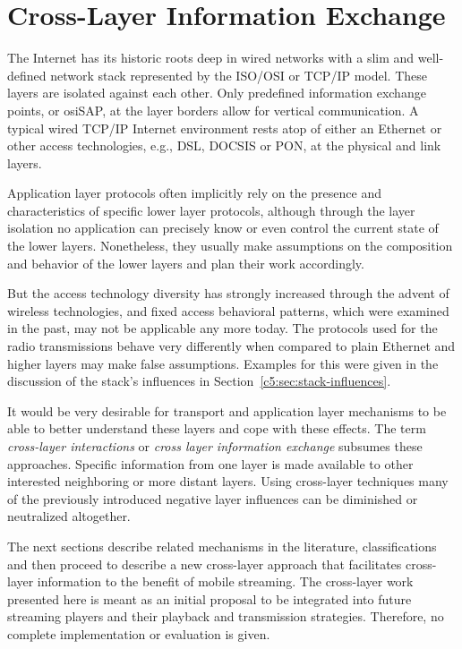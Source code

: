 \section{Cross-Layer Information Exchange}
\label{c5:sec:crosslayerhinting}

The Internet has its historic roots deep in wired networks with a slim and well-defined network stack represented by the \acrshort{ISO}/\acrshort{OSI} or \gls{TCP}/\gls{IP} model. These layers are isolated against each other. Only predefined information exchange points, or \gls{osiSAP}, at the layer borders allow for vertical communication. A typical wired \gls{TCP}/\gls{IP} Internet environment rests atop of either an Ethernet or other access technologies, e.g., \acrshort{DSL}, \acrshort{DOCSIS} or \acrshort{PON}, at the physical and link layers.

Application layer protocols often implicitly rely on the presence and characteristics of specific lower layer protocols,  although through the layer isolation no application can precisely know or even control the current state of the lower layers. Nonetheless, they usually make assumptions on the composition and behavior of the lower layers and plan their work accordingly. 

But the access technology diversity has strongly increased through the advent of wireless technologies, and fixed access behavioral patterns, which were examined in the past, may not be applicable any more today. The protocols used for the radio transmissions behave very differently when compared to plain Ethernet and higher layers may make false assumptions. Examples for this were given in the discussion of the stack's influences in Section~\ref{c5:sec:stack-influences}.

It would be very desirable for transport and application layer mechanisms to be able to better understand these layers and cope with these effects. The term \textit{cross-layer interactions} or \textit{cross layer information exchange} subsumes these approaches. Specific information from one layer is made available to other interested neighboring or more distant layers. Using cross-layer techniques many of the previously introduced negative layer influences can be diminished or neutralized altogether.

The next sections describe related mechanisms in the literature, classifications and then proceed to describe a new cross-layer approach that facilitates cross-layer information to the benefit of mobile streaming. The cross-layer work presented here is meant as an initial proposal to be integrated into future streaming players and their playback and transmission strategies. Therefore, no complete implementation or evaluation is given.


